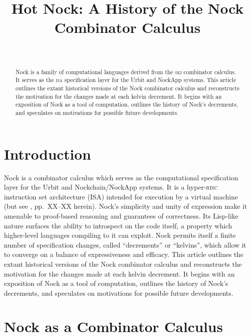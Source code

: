 \documentclass[twoside]{article}
\title{Hot Nock:  A History of the Nock Combinator Calculus}
\author{\authorname~\authorpatp \\ \affiliation}
\date{}
\begin{document}
\maketitle
\thispagestyle{firststyle}

\begin{abstract}
  Nock is a family of computational languages derived from the \textsc{ski} combinator calculus.  It serves as the \textsc{isa} specification layer for the Urbit and NockApp systems.  This article outlines the extant historical versions of the Nock combinator calculus and reconstructs the motivation for the changes made at each kelvin decrement.  It begins with an exposition of Nock as a tool of computation, outlines the history of Nock's decrements, and speculates on motivations for possible future developments.
\end{abstract}

\setcounter{page}{1}

\tableofcontents

\section{Introduction}

Nock is a combinator calculus which serves as the computational specification layer for the Urbit and Nockchain/NockApp systems.  It is a hyper-\textsc{risc} instruction set architecture (ISA) intended for execution by a virtual machine (but see \citet{Mopfel2025}, pp.~XX–XX herein).  Nock's simplicity and unity of expression make it amenable to proof-based reasoning and guarantees of correctness.  Its Lisp-like nature surfaces the ability to introspect on the code itself, a property which higher-level languages compiling to it can exploit.  Nock permits itself a finite number of specification changes, called ``decrements'' or ``kelvins'', which allow it to converge on a balance of expressiveness and efficacy.  This article outlines the extant historical versions of the Nock combinator calculus and reconstructs the motivation for the changes made at each kelvin decrement.  It begins with an exposition of Nock as a tool of computation, outlines the history of Nock's decrements, and speculates on motivations for possible future developments.

\section{Nock as a Combinator Calculus}
\end{document}
